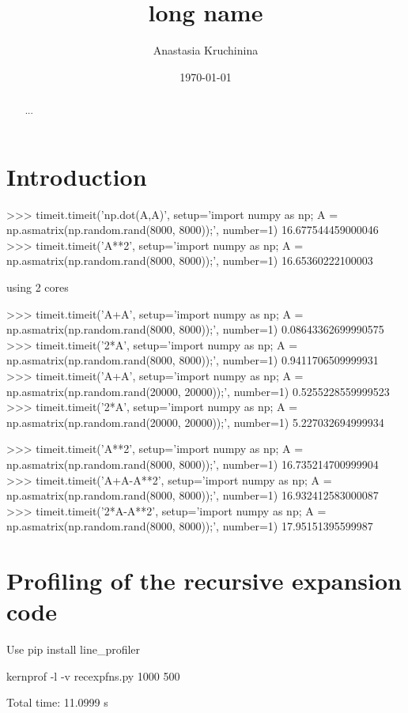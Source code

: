 \documentclass{amsart}
\title[short name]{long name}
\author{Anastasia Kruchinina}
\date{\today}
\begin{document}
\begin{abstract}
...
\end{abstract}
\maketitle

\tableofcontents


\section{Introduction}


>>> timeit.timeit('np.dot(A,A)', setup='import numpy as np; A = np.asmatrix(np.random.rand(8000, 8000));', number=1)
16.677544459000046
>>> timeit.timeit('A**2', setup='import numpy as np; A = np.asmatrix(np.random.rand(8000, 8000));', number=1)
16.65360222100003

using 2 cores







>>> timeit.timeit('A+A', setup='import numpy as np; A = np.asmatrix(np.random.rand(8000, 8000));', number=1)
0.08643362699990575
>>> timeit.timeit('2*A', setup='import numpy as np; A = np.asmatrix(np.random.rand(8000, 8000));', number=1)
0.9411706509999931
>>> timeit.timeit('A+A', setup='import numpy as np; A = np.asmatrix(np.random.rand(20000, 20000));', number=1)
0.5255228559999523
>>> timeit.timeit('2*A', setup='import numpy as np; A = np.asmatrix(np.random.rand(20000, 20000));', number=1)
5.227032694999934


>>> timeit.timeit('A**2', setup='import numpy as np; A = np.asmatrix(np.random.rand(8000, 8000));', number=1)
16.735214700999904
>>> timeit.timeit('A+A-A**2', setup='import numpy as np; A = np.asmatrix(np.random.rand(8000, 8000));', number=1)
16.932412583000087
>>> timeit.timeit('2*A-A**2', setup='import numpy as np; A = np.asmatrix(np.random.rand(8000, 8000));', number=1)
17.95151395599987




\section{Profiling of the recursive expansion code}

Use pip install line_profiler

kernprof -l -v recexpfns.py 1000 500

Total time: 11.0999 s
\end{document}
